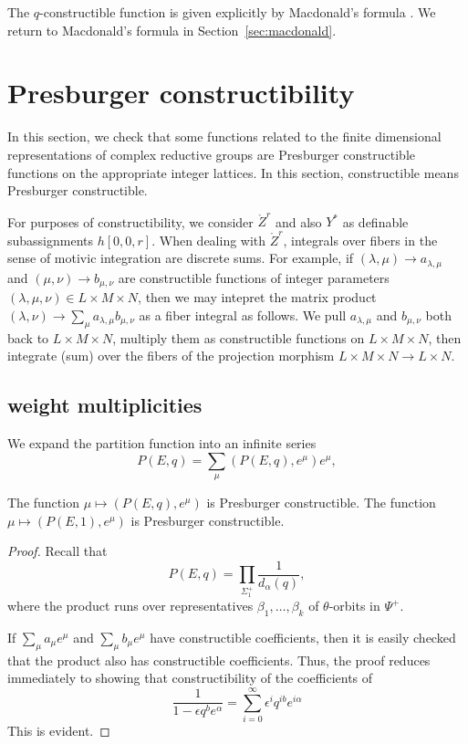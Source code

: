 The $q$-constructible function is given explicitly by Macdonald's
formula \cite{casselman1980unramified}.  We return to Macdonald's
formula in Section~\ref{sec:macdonald}.


\section{Presburger constructibility}

In this section, we check that some functions related to the finite
dimensional representations of complex reductive groups are Presburger
constructible functions on the appropriate integer lattices.  In this
section, constructible means Presburger constructible.

\begin{remark}\label{rem:matrix}
  For purposes of constructibility, we consider $\ring{Z}^r$ and also
  $Y^*$ as definable subassignments $h[0,0,r]$. When dealing with
  $\ring{Z}^r$, integrals over fibers in the sense of motivic
  integration are discrete sums.  For example, if $(\lambda,\mu)\to
  a_{\lambda,\mu}$ and $(\mu,\nu)\to b_{\mu,\nu}$ are constructible
  functions of integer parameters $(\lambda,\mu,\nu)\in L\times
  M\times N$, then we may intepret the matrix product
  $(\lambda,\nu)\to \sum_{\mu} a_{\lambda,\mu} b_{\mu,\nu}$ as a fiber
  integral as follows.  We pull $a_{\lambda,\mu}$ and $b_{\mu,\nu}$
  both back to $L\times M\times N$, multiply them as constructible
  functions on $L\times M\times N$, then integrate (sum) over the
  fibers of the projection morphism $L\times M\times N\to L\times N$.
\end{remark}


\subsection{weight multiplicities}

We expand the partition function into an infinite series
\[
P(E,q) = \sum_\mu (P(E,q),e^\mu) e^{\mu},
\]

\begin{lemma}\label{lemma:partition}
  The function $\mu\mapsto (P(E,q),e^\mu)$ is Presburger
  constructible.  The function $\mu\mapsto (P(E,1),e^\mu)$ is
  Presburger constructible.
\end{lemma}

\begin{proof} 
Recall that
\[
P(E,q) = \prod_{\Sigma_1^+} \frac{1}{d_\alpha(q)},
\]
where the product runs over representatives $\beta_1,\ldots,\beta_k$
of $\theta$-orbits in $\Psi^+$.

If $\sum_\mu a_\mu e^\mu$ and $\sum_\mu b_\mu e^\mu$ have
constructible coefficients, then it is easily checked that the product
also has constructible coefficients.  Thus, the proof reduces
immediately to showing that constructibility of the coefficients of
\[
\frac{1}{1-\epsilon q^b e^\alpha} 
= \sum_{i=0}^\infty \epsilon^i q^{i b} e^{i\alpha}
\]
This is evident.
\end{proof}

